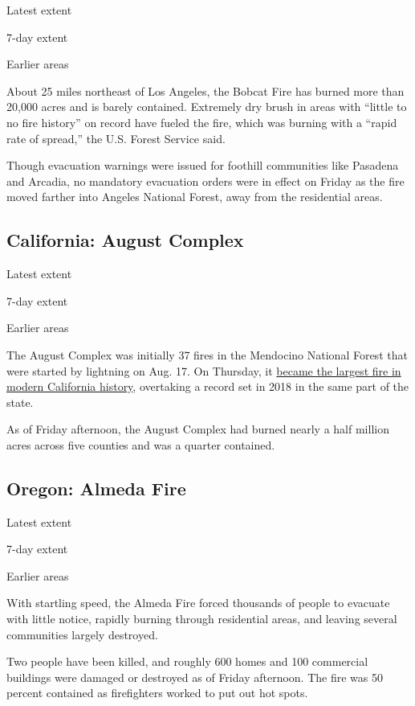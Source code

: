 Latest extent

7-day extent

Earlier areas

About 25 miles northeast of Los Angeles, the Bobcat Fire has burned more
than 20,000 acres and is barely contained. Extremely dry brush in areas
with ``little to no fire history'' on record have fueled the fire, which
was burning with a ``rapid rate of spread,'' the U.S. Forest Service
said.

Though evacuation warnings were issued for foothill communities like
Pasadena and Arcadia, no mandatory evacuation orders were in effect on
Friday as the fire moved farther into Angeles National Forest, away from
the residential areas.

\hypertarget{california-august-complex}{%
\subsection{California: August
Complex}\label{california-august-complex}}

Latest extent

7-day extent

Earlier areas

The August Complex was initially 37 fires in the Mendocino National
Forest that were started by lightning on Aug. 17. On Thursday, it
\href{https://www.nytimes3xbfgragh.onion/2020/09/10/us/wildfires-live-updates.html\#link-1471a6ef}{became
the largest fire in modern California history}, overtaking a record set
in 2018 in the same part of the state.

As of Friday afternoon, the August Complex had burned nearly a half
million acres across five counties and was a quarter contained.

\hypertarget{oregon-almeda-fire}{%
\subsection{Oregon: Almeda Fire}\label{oregon-almeda-fire}}

Latest extent

7-day extent

Earlier areas

With startling speed, the Almeda Fire forced thousands of people to
evacuate with little notice, rapidly burning through residential areas,
and leaving several communities largely destroyed.

Two people have been killed, and roughly 600 homes and 100 commercial
buildings were damaged or destroyed as of Friday afternoon. The fire was
50 percent contained as firefighters worked to put out hot spots.

